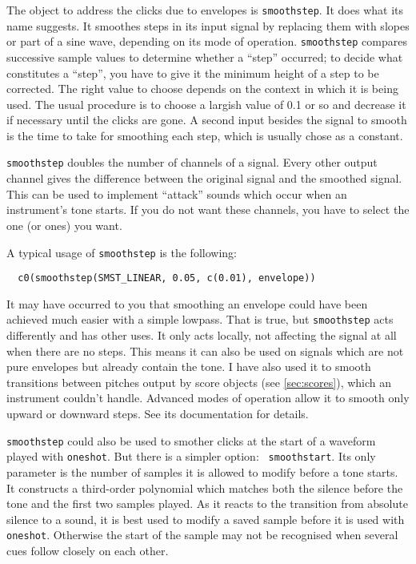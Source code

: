 \documentclass{article}
\def\bv{\begin{verbatim}}
\begin{document}
The object to address the clicks due to envelopes is {\tt smoothstep}.  It does
what its name suggests.  It smoothes steps in its input signal by replacing
them with slopes or part of a sine wave, depending on its mode of operation.
{\tt smoothstep} compares successive sample values to determine whether a
``step'' occurred; to decide what constitutes a ``step'', you have to give it
the minimum height of a step to be corrected.  The right value to choose
depends on the context in which it is being used.  The usual procedure is to
choose a largish value of 0.1 or so and decrease it if necessary until the
clicks are gone.  A second input besides the signal to smooth is the time to
take for smoothing each step, which is usually chose as a constant.

{\tt smoothstep} doubles the number of channels of a signal.  Every other
output channel gives the difference between the original signal and the
smoothed signal.  This can be used to implement ``attack'' sounds which occur
when an instrument's tone starts.  If you do not want these channels, you have
to select the one (or ones) you want.

A typical usage of {\tt smoothstep} is the following:

\bv
  c0(smoothstep(SMST_LINEAR, 0.05, c(0.01), envelope))
\end{verbatim}

It may have occurred to you that smoothing an envelope could have been achieved
much easier with a simple lowpass.  That is true, but {\tt smoothstep} acts
differently and has other uses.  It only acts locally, not affecting the signal
at all when there are no steps.  This means it can also be used on signals
which are not pure envelopes but already contain the tone.  I have also used it
to smooth transitions between pitches output by score objects (see
\autoref{sec:scores}), which an instrument couldn't handle.  Advanced modes of
operation allow it to smooth only upward or downward steps.  See its
documentation for details.

{\tt smoothstep} could also be used to smother clicks at the start of a
waveform played with {\tt oneshot}.  But there is a simpler option: {\tt
smoothstart}.  Its only parameter is the number of samples it is allowed to
modify before a tone starts.  It constructs a third-order polynomial which
matches both the silence before the tone and the first two samples played.
As it reacts to the transition from absolute silence to a sound, it is best
used to modify a saved sample before it is used with {\tt oneshot}.  Otherwise
the start of the sample may not be recognised when several cues follow closely
on each other.
\end{document}
